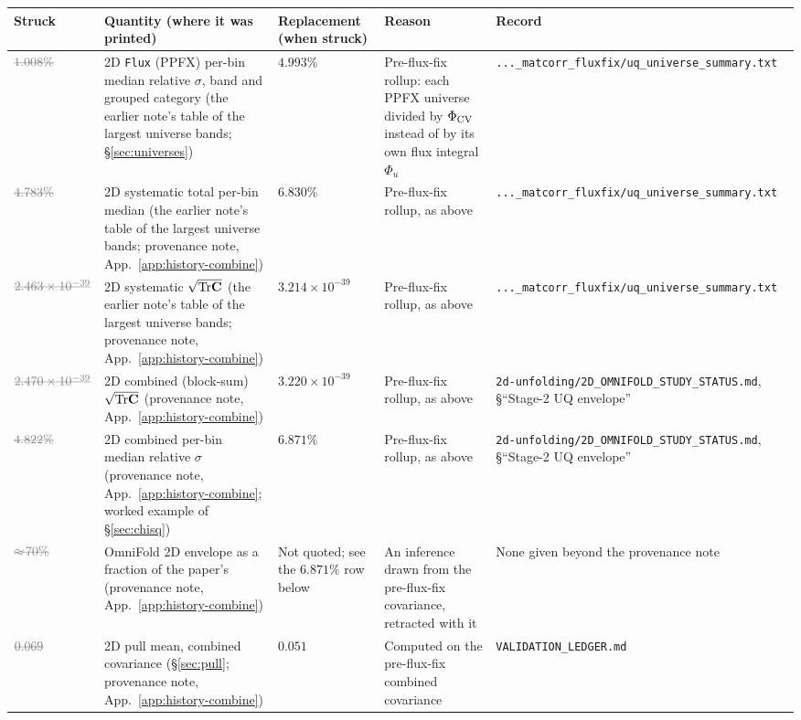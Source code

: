 {\footnotesize
\setlength{\tabcolsep}{3pt}
\begin{longtable}{@{}>{\raggedright\arraybackslash}p{}
                  >{\raggedright\arraybackslash}p{}
                  >{\raggedright\arraybackslash}p{}
                  >{\raggedright\arraybackslash}p{}
                  >{\raggedright\arraybackslash}p{}@{}}
\toprule
Struck & Quantity (where it was printed) & Replacement (when struck) & Reason & Record \\
\midrule
\endhead
$\dead{1.008\%}$ & 2D \texttt{Flux} (PPFX) per-bin median relative $\sigma$, band and grouped category (the earlier note's table of the largest universe bands; \S\ref{sec:universes}) & $4.993\%$ & Pre-flux-fix rollup: each PPFX universe divided by $\Phi_{\rm CV}$ instead of by its own flux integral $\Phi_u$ & \texttt{...\_matcorr\_fluxfix/uq\_universe\_summary.txt} \\
$\dead{4.783\%}$ & 2D systematic total per-bin median (the earlier note's table of the largest universe bands; provenance note, App.~\ref{app:history-combine}) & $6.830\%$ & Pre-flux-fix rollup, as above & \texttt{...\_matcorr\_fluxfix/uq\_universe\_summary.txt} \\
$\dead{2.463\times10^{-39}}$ & 2D systematic $\sqrt{\mathrm{Tr}\mathbf{C}}$ (the earlier note's table of the largest universe bands; provenance note, App.~\ref{app:history-combine}) & $3.214\times10^{-39}$ & Pre-flux-fix rollup, as above & \texttt{...\_matcorr\_fluxfix/uq\_universe\_summary.txt} \\
$\dead{2.470\times10^{-39}}$ & 2D combined (block-sum) $\sqrt{\mathrm{Tr}\mathbf{C}}$ (provenance note, App.~\ref{app:history-combine}) & $3.220\times10^{-39}$ & Pre-flux-fix rollup, as above & \texttt{2d-unfolding/2D\_OMNIFOLD\_STUDY\_STATUS.md}, \S``Stage-2 UQ envelope'' \\
$\dead{4.822\%}$ & 2D combined per-bin median relative $\sigma$ (provenance note, App.~\ref{app:history-combine}; worked example of \S\ref{sec:chisq}) & $6.871\%$ & Pre-flux-fix rollup, as above & \texttt{2d-unfolding/2D\_OMNIFOLD\_STUDY\_STATUS.md}, \S``Stage-2 UQ envelope'' \\
$\dead{\approx\!70\%}$ & OmniFold 2D envelope as a fraction of the paper's (provenance note, App.~\ref{app:history-combine}) & Not quoted; see the $6.871\%$ row below & An inference drawn from the pre-flux-fix covariance, retracted with it & None given beyond the provenance note \\
$\dead{0.069}$ & 2D pull mean, combined covariance (\S\ref{sec:pull}; provenance note, App.~\ref{app:history-combine}) & $0.051$ & Computed on the pre-flux-fix combined covariance & \texttt{VALIDATION\_LEDGER.md} \\

\end{longtable}}
